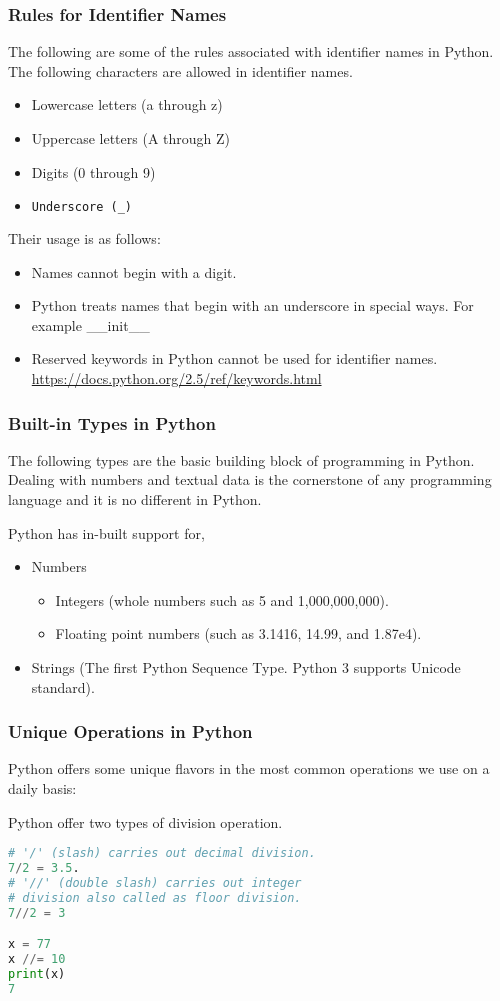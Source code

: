 \documentclass{beamer}
\begin{document}
\begin{frame}[fragile]
\frametitle{Rules for Identifier Names}
The following are some of the rules associated with identifier names in Python.
The following characters are allowed in identifier names.
\begin{itemize}
\item Lowercase letters (a through z)
\item Uppercase letters (A through Z)
\item Digits (0 through 9)
\item \begin{lstlisting}[language=Python]
Underscore (_)
\end{lstlisting}
\end{itemize}
Their usage is as follows:
\begin{itemize}
\item Names cannot begin with a digit.
\item Python treats names that begin with an underscore in special ways. For example \_\_init\_\_
\item Reserved keywords in Python cannot be used for identifier names. \url{https://docs.python.org/2.5/ref/keywords.html}
\end{itemize}
\end{frame}

\begin{frame}
\frametitle{Built-in Types in Python}
The following types are the basic  building block of programming in Python. Dealing with numbers and textual data is the cornerstone of any programming language and it is no different in Python.

Python has in-built support for,
\begin{itemize}
\item Numbers
\begin{itemize}
\item Integers (whole numbers such as 5 and 1,000,000,000).
\item Floating point numbers (such as 3.1416, 14.99, and 1.87e4).
\end{itemize}
\item Strings (The first Python Sequence Type. Python 3 supports Unicode standard).
\end{itemize}
\end{frame}


\begin{frame}[fragile]
\frametitle{Unique Operations in Python}
Python offers some unique flavors in the most common operations we use on a daily basis:

Python offer two types of division operation.
\begin{lstlisting}[language=Python]
# '/' (slash) carries out decimal division.
7/2 = 3.5.
# '//' (double slash) carries out integer
# division also called as floor division.
7//2 = 3

x = 77
x //= 10
print(x)
7
\end{lstlisting}
\end{frame}
\end{document}
